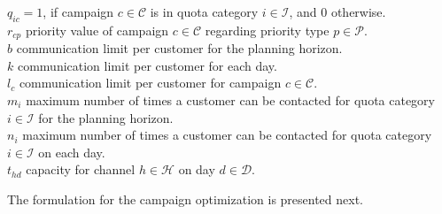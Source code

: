 \documentclass[11pt]{article}
\begin{document}
\begin{singlespace}
\noindent $q_{{i}{c}}=1$, if campaign $c \in \mathcal{C}$ is in quota category $i \in \mathcal{I}$, and 0 otherwise.\\

\noindent $r_{{c}{p}}$ priority value of campaign $c \in \mathcal{C}$ regarding priority type $p \in \mathcal{P}$.\\

\noindent $b$ communication limit per customer for the planning horizon.\\

\noindent $k$ communication limit per customer for each day.\\

\noindent $l_{c}$ communication limit per customer for campaign $c \in \mathcal{C}$.\\

\noindent $m_{i}$ maximum number of times a customer can be contacted for quota category $i \in \mathcal{I}$ for the planning horizon.\\

\noindent $n_{i}$ maximum number of times a customer can be contacted for quota category $i \in \mathcal{I}$ on each day.\\

\noindent $t_{{h}{d}}$ capacity for channel $h \in \mathcal{H}$ on day $d \in \mathcal{D}$.\\
\end{singlespace}

\noindent The formulation for the campaign optimization is presented next.
\end{document}
